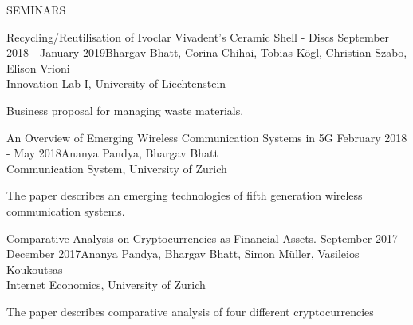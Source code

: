 \documentclass{resume} %
\begin{document}
\begin{rSection}{SEMINARS}
\begin{rSubsection}{Recycling/Reutilisation of Ivoclar Vivadent’s Ceramic Shell - Discs
}{September 2018 - January 2019}{Bhargav Bhatt, Corina Chihai, Tobias K{\"o}gl, Christian Szabo, Elison Vrioni}{\\Innovation Lab I, University of Liechtenstein} 
\item Business proposal for managing waste materials.
\end{rSubsection} 
\begin{rSubsection}{An Overview of Emerging Wireless Communication Systems in 5G
}{February 2018 - May 2018}{Ananya Pandya, Bhargav Bhatt}{\\Communication System, University of Zurich}
\item The paper describes an emerging technologies of fifth generation wireless communication systems.
\end{rSubsection} 
\begin{rSubsection}{Comparative Analysis on Cryptocurrencies as Financial Assets.
}{September 2017 - December 2017}{Ananya Pandya, Bhargav Bhatt, Simon M\"uller, Vasileios Koukoutsas}{\\Internet Economics, University of Zurich}
\item The paper describes comparative analysis of four different cryptocurrencies
\end{rSubsection} 
\end{rSection} 

\end{document}

